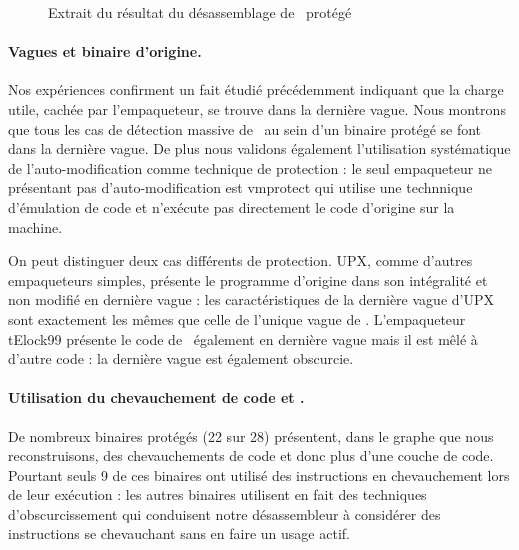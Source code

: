 \begin{figure}[h]
\begin{small}
 
\end{small}
\caption{Extrait du résultat du désassemblage de \hostname\ protégé}
\label{fig:packers_extrait}
\end{figure}

\paragraph{Vagues et binaire d'origine.}
Nos expériences confirment un fait étudié précédemment \cite{Calvet2013,renovo,polyunpack} indiquant que la charge utile, cachée par l'empaqueteur, se trouve dans la dernière vague.
Nous montrons que tous les cas de détection massive de \hostname\ au sein d'un binaire protégé se font dans la dernière vague.
De plus nous validons également l'utilisation systématique de l'auto-modification comme technique de protection : le seul empaqueteur ne présentant pas d'auto-modification est vmprotect qui utilise une technnique d'émulation de code et n'exécute pas directement le code d'origine sur la machine.

On peut distinguer deux cas différents de protection. UPX, comme d'autres empaqueteurs simples, présente le programme d'origine dans son intégralité et non modifié en dernière vague : les caractéristiques de la dernière vague d'UPX sont exactement les mêmes que celle de l'unique vague de \hostname. L'empaqueteur tElock99 présente le code de \hostname\ également en dernière vague mais il est mêlé à d'autre code : la dernière vague est également obscurcie.

\paragraph{Utilisation du chevauchement de code et \layers.}
De nombreux binaires protégés (22 sur 28) présentent, dans le graphe que nous reconstruisons, des chevauchements de code et donc plus d'une couche de code. Pourtant seuls 9 de ces binaires ont utilisé des instructions en chevauchement lors de leur exécution : les autres binaires utilisent en fait des techniques d'obscurcissement qui conduisent notre désassembleur à considérer des instructions se chevauchant sans en faire un usage actif. 

